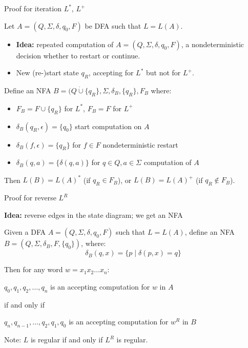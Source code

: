 \documentclass[handout]{beamer}
\begin{document}
\begin{frame}{Proof for iteration $L^*$, $L^+$}

    Let $A=(Q,\Sigma, \delta,q_0,F)$ be DFA such that $L=L(A)$. 
    \begin{itemize}
        \item \textbf{Idea:} repeated computation of $A=(Q,\Sigma, \delta,q_0,F)$, a nondeterministic decision whether to restart or continue.
        \item New (re-)start state $q_R$, accepting for $L^*$ but not for $L^+$.
    \end{itemize}
       
    Define an NFA $B=(Q\mathbin{\dot\cup}\{q_R\},\Sigma,\delta_B,\{q_R\},F_B$ where:
    \begin{itemize}
        \item $F_B=F\cup\{q_R\}$ for $L^*$, $F_B=F$ for $L^+$
        \item $\delta_B(q_R,\epsilon)=\{q_0\}$ \hfill start computation on $A$
        \item $\delta_B(f,\epsilon)=\{q_R\}$ for $f\in F$ \hfill nondeterministic restart
        \item $\delta_B(q,a)=\{\delta(q,a)\}$ for $q\in Q,a\in \Sigma$ \hfill computation of $A$
    \end{itemize}

    Then $L(B)=L(A)^*$ (if $q_R\in F_B$), or $L(B)=L(A)^+$ (if $q_R\notin F_B$).
    
    \hfill\qedsymbol

\end{frame}
    

\begin{frame}{Proof for reverse $L^R$}

    \textbf{Idea:} reverse edges in the state diagram; we get an NFA

    Given a DFA  $A=(Q,\Sigma, \delta,q_0,F)$ such that $L=L(A)$, define an NFA $B=(Q,\Sigma,\delta_B,F,\{q_0\})$, where:
    $$
        \delta_B(q,x)=\{p\mid \delta(p,x)=q\}
    $$

    Then for any word $w=x_1x_2\ldots x_n$:
    
    \begin{center}
        $q_0,q_1,q_2,\ldots, q_n$ is an accepting computation for $w$ in $A$   

        if and only if

        $q_n,q_{n-1},\ldots,q_2,q_1,q_0$ is an accepting computation for $w^R$ in $B$
    \end{center}
    \hfill\qedsymbol

    Note: $L$ is regular \alert{if and only if} $L^R$ is regular.

\end{frame}
\end{document}
